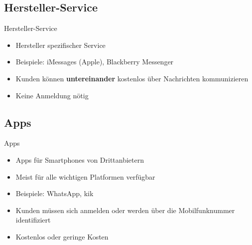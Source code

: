 \documentclass{beamer}
\begin{document}
\subsection{Hersteller-Service}
\begin{frame}{Hersteller-Service}
	\begin{itemize}
		\item Hersteller spezifischer Service
		\item Beispiele: iMessages (Apple), Blackberry Messenger
		\item Kunden können \textbf{untereinander} kostenlos über Nachrichten kommunizieren
		\item Keine Anmeldung nötig
	\end{itemize}
\end{frame}

\subsection{Apps}
\begin{frame}{Apps}
	\begin{itemize}
		\item Apps für Smartphones von Drittanbietern
		\item Meist für alle wichtigen Platformen verfügbar
		\item Beispiele: WhatsApp, kik
		\item Kunden müssen sich anmelden oder werden über die Mobilfunknummer identifiziert
		\item Kostenlos oder geringe Kosten
	\end{itemize}
\end{frame}
\end{document}
